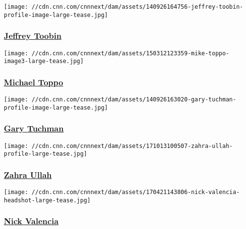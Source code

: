 \href{/profiles/jeffrey-toobin-profile}{}

\texttt{[image: //cdn.cnn.com/cnnnext/dam/assets/140926164756-jeffrey-toobin-profile-image-large-tease.jpg]}

\hypertarget{jeffrey-toobin}{%
\subsubsection{\texorpdfstring{\href{/profiles/jeffrey-toobin-profile}{Jeffrey
Toobin}}{Jeffrey Toobin}}\label{jeffrey-toobin}}

\href{/profiles/michael-toppo}{}

\texttt{[image: //cdn.cnn.com/cnnnext/dam/assets/150312123359-mike-toppo-image3-large-tease.jpg]}

\hypertarget{michael-toppo}{%
\subsubsection{\texorpdfstring{\href{/profiles/michael-toppo}{Michael
Toppo}}{Michael Toppo}}\label{michael-toppo}}

\href{/profiles/gary-tuchman-profile}{}

\texttt{[image: //cdn.cnn.com/cnnnext/dam/assets/140926163020-gary-tuchman-profile-image-large-tease.jpg]}

\hypertarget{gary-tuchman}{%
\subsubsection{\texorpdfstring{\href{/profiles/gary-tuchman-profile}{Gary
Tuchman}}{Gary Tuchman}}\label{gary-tuchman}}

\href{/profiles/zahra-ullah-profile}{}

\texttt{[image: //cdn.cnn.com/cnnnext/dam/assets/171013100507-zahra-ullah-profile-large-tease.jpg]}

\hypertarget{zahra-ullah}{%
\subsubsection{\texorpdfstring{\href{/profiles/zahra-ullah-profile}{Zahra
Ullah}}{Zahra Ullah}}\label{zahra-ullah}}

\href{/profiles/nick-valencia-profile}{}

\texttt{[image: //cdn.cnn.com/cnnnext/dam/assets/170421143806-nick-valencia-headshot-large-tease.jpg]}

\hypertarget{nick-valencia}{%
\subsubsection{\texorpdfstring{\href{/profiles/nick-valencia-profile}{Nick
Valencia}}{Nick Valencia}}\label{nick-valencia}}

